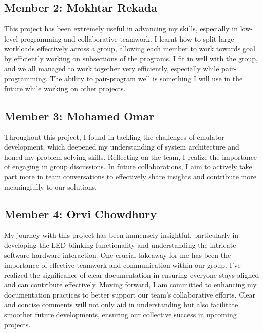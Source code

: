 \documentclass[a4paper, 10pt]{article}
\begin{document}
\subsection{Member 2: Mokhtar Rekada}
This project has been extremely useful in advancing my skills, especially in low-level programming and collaborative teamwork. I learnt how to split large workloads effectively across a group, allowing each member to work towards goal by efficiently working on subsections of the programs. I fit in well with the group, and we all managed to work together very efficiently, especially while pair-programming. The ability to pair-program well is something I will use in the future while working on other projects.

\subsection{Member 3: Mohamed Omar}
Throughout this project, I found  in tackling the challenges of emulator development, which deepened my understanding of system architecture and honed my problem-solving skills. Reflecting on the team, I realize the importance of engaging in group discussions. In future collaborations, I aim to actively take part more in team conversations to effectively share insights and contribute more meaningfully to our solutions. 

\subsection{Member 4: Orvi Chowdhury}
My journey with this project has been immensely insightful, particularly in developing the LED blinking functionality and understanding the intricate software-hardware interaction. One crucial takeaway for me has been the importance of effective teamwork and communication within our group. I've realized the significance of clear documentation in ensuring everyone stays aligned and can contribute effectively. Moving forward, I am committed to enhancing my documentation practices to better support our team's collaborative efforts. Clear and concise comments will not only aid in understanding but also facilitate smoother future developments, ensuring our collective success in upcoming projects.
\end{document}

